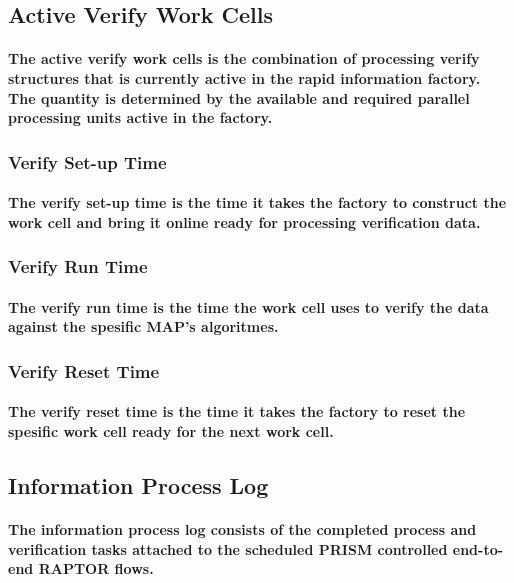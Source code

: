 \documentclass{acm_proc_article-sp}
\begin{document}
\subsection{Active Verify Work Cells}
\paragraph{The active verify work cells is the combination of processing verify structures that is currently active in the rapid information factory. The quantity is determined by the available and required parallel processing units active in the factory.}
\subsubsection{Verify Set-up Time}
\paragraph{The verify set-up time is the time it takes the factory to construct the work cell and bring it online ready for processing verification data.}
\subsubsection{Verify Run Time}
\paragraph{The verify run time is the time the work cell uses to verify the data against the spesific MAP's algoritmes.}
\subsubsection{Verify Reset Time}
\paragraph{The verify reset time is the time it takes the factory to reset the spesific work cell ready for the next work cell.}
\subsection{Information Process Log}
\paragraph{The information process log consists of the completed process and verification tasks attached to the scheduled PRISM controlled end-to-end RAPTOR flows.}
\pagebreak
\end{document}
